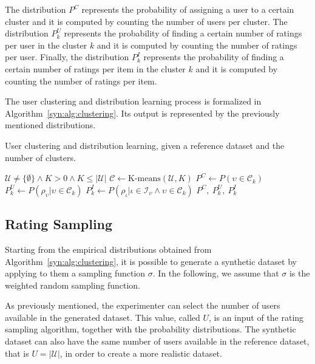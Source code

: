 The distribution $P^C$ represents the probability of assigning a user to a certain cluster and it is computed by counting the number of users per cluster. The distribution $P^U_k$ represents the probability of finding a certain number of ratings per user in the cluster $k$ and it is computed by counting the number of ratings per user. Finally, the distribution $P^I_k$ represents the probability of finding a certain number of ratings per item in the cluster $k$ and it is computed by counting the number of ratings per item.

The user clustering and distribution learning process is formalized in Algorithm~\ref{syn:alg:clustering}. Its output is represented by the previously mentioned distributions.

\begin{algorithm}[ht]
\caption{User clustering and distribution learning, given a reference dataset and the number of clusters.}
\label{syn:alg:clustering}
\begin{algorithmic}[1]
\REQUIRE $\mathcal{U} \neq \{\emptyset\} \land K > 0 \land K \leq |\mathcal{U}|$
\STATE $\mathcal{C} \gets \textrm{K-means}(\mathcal{U}, K)$
\STATE $P^C \gets P(\upsilon \in \mathcal{C}_k)$
\STATE $P^U_k \gets P(\rho_{\upsilon} | \upsilon \in \mathcal{C}_k)$
\STATE $P^I_k \gets P(\rho_{\iota} | \iota \in \mathcal{I}_{\upsilon} \land \upsilon \in \mathcal{C}_k)$
\ENDFOR
\RETURN $P^C,\ P^U_k,\ P^I_k$
\end{algorithmic}
\end{algorithm}

\subsection{Rating Sampling}
\label{syn:sec:generate}

Starting from the empirical distributions obtained from Algorithm~\ref{syn:alg:clustering}, it is possible to generate a synthetic dataset by applying to them a sampling function $\sigma$. In the following, we assume that $\sigma$ is the weighted random sampling function.

As previously mentioned, the experimenter can select the number of users available in the generated dataset. This value, called $U$, is an input of the rating sampling algorithm, together with the probability distributions. The synthetic dataset can also have the same number of users available in the reference dataset, that is $U = |\mathcal{U}|$, in order to create a more realistic dataset.

